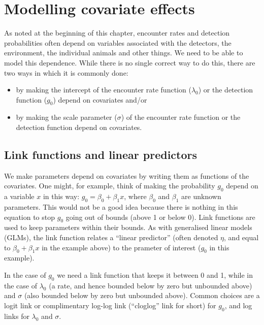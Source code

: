 \documentclass[graybox,envcountchap,sectrefs]{SpringerStyleFiles/styles/svmono}\usepackage[]{graphicx}\usepackage[]{color}
\newcommand{\bi}{\begin{itemize}}
\newcommand{\ei}{\end{itemize}}
\begin{document}
\section{Modelling covariate effects}

As noted at the beginning of this chapter, encounter rates and detection probabilities often depend on variables associated with the detectors, the environment, the individual animals and other things. We need to be able to model this dependence. While there is no single correct way to do this, there are two ways in which it is commonly done:
\bi
\item by making the intercept of the encounter rate function ($\lambda_0$) or the detection function ($g_0$) depend on covariates and/or
\item by making the scale parameter ($\sigma$) of the encounter rate function or the detection function depend on covariates.
\ei

\subsection{Link functions and linear predictors}

We make parameters depend on covariates by writing them as functions of the covariates. One might, for example, think of making the probability $g_0$ depend on a variable $x$ in this way: $g_0=\beta_0 + \beta_1 x$, where $\beta_0$ and $\beta_1$ are unknown parameters. This would not be a good idea because there is nothing in this equation to stop $g_0$ going out of bounds (above 1 or below 0). Link functions are used to keep parameters within their bounds. As with generalised linear models (GLMs), the link function relates a ``linear predictor'' (often denoted $\eta$, and equal to $\beta_0 + \beta_1 x$ in the example above) to the prameter of interest ($g_0$ in this example).

In the case of $g_0$ we need a link function that keeps it between 0 and 1, while in the case of $\lambda_0$ (a rate, and hence bounded below by zero but unbounded above) and $\sigma$ (also bounded below by zero but unbounded above). Common choices are a logit link or complimentary log-log link (``cloglog'' link for short) for $g_0$, and log links for $\lambda_0$ and $\sigma$. 
\end{document}
